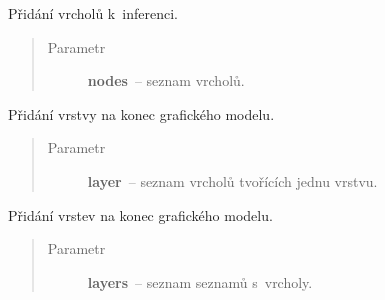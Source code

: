 \begin{fulllineitems}

\begin{fulllineitems}
\label{alex.infer:alex.infer.factor.alex.infer.lbp.LBP.add_nodes}
Přidání vrcholů k~inferenci.
\begin{quote}\begin{description}
\item[{Parametr}] \leavevmode
\textbf{nodes}~-- seznam vrcholů.

\end{description}\end{quote}

\end{fulllineitems}


\begin{fulllineitems}
\label{alex.infer:alex.infer.factor.alex.infer.lbp.LBP.add_layer}
Přidání vrstvy na konec grafického modelu.
\begin{quote}\begin{description}
\item[{Parametr}] \leavevmode
\textbf{layer}~-- seznam vrcholů tvořících jednu vrstvu.

\end{description}\end{quote}

\end{fulllineitems}


\begin{fulllineitems}
\label{alex.infer:alex.infer.factor.alex.infer.lbp.LBP.add_layers}
Přidání vrstev na konec grafického modelu.
\begin{quote}\begin{description}
\item[{Parametr}] \leavevmode
\textbf{layers}~-- seznam seznamů s~vrcholy.

\end{description}\end{quote}

\end{fulllineitems}


\end{fulllineitems}
